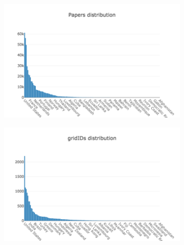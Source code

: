 \documentclass{llncs}
\begin{document}
\begin{figure}[t]
\begin{subfigure}{.5\textwidth}
	\centering
    \includegraphics[width=\textwidth]{images/macro_dois_longtail.png}
	\caption[ ]{}
	\label{fig:macro_dois_longtail}
\end{subfigure}%
\begin{subfigure}{.5\textwidth}
	\centering
    \includegraphics[width=\textwidth]{images/macro_gridids_longtail.png}

\end{subfigure}
\end{figure}
\end{document}
